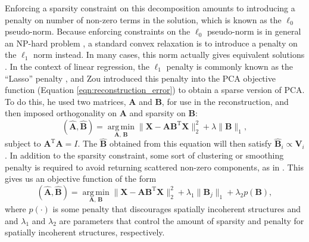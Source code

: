 \documentclass[11pt]{nih}
\begin{document}
Enforcing a sparsity constraint on this decomposition amounts to introducing a penalty on number of non-zero terms in the solution, which is known as the  $\ell_0$ pseudo-norm.  Because enforcing constraints on the $\ell_0$ pseudo-norm is in general an NP-hard problem \cite{natarajan_sparse_1995}, a standard convex relaxation is to introduce a penalty on the $\ell_1$ norm instead.  In many cases, this norm actually gives equivalent solutions \cite{donoho_for_2006}.   In the context of linear regression, the $\ell_1$ penalty is commonly known as the ``Lasso'' penalty \cite{tibshirani_regression_1996}, and Zou \cite{zou_sparse_2006} introduced this penalty into the PCA objective function (Equation \ref{eqn:reconstruction_error}) to obtain a sparse version of PCA. To do this, he used two matrices, $\mathbf{A}$ and $\mathbf{B}$, for use in the reconstruction, and then imposed orthogonality on $\mathbf{A}$ and sparsity on $\mathbf{B}$: 
\begin{equation}
(\hat{\mathbf{A}},\hat{\mathbf{B}}) = \underset{\mathbf{A},\, \mathbf{B}} {\operatorname{arg\,min}}  \| \mathbf{X} - \mathbf{A} \mathbf{B}^{\mathrm{T}} \mathbf{X}\|_2^2 + \lambda \| \mathbf{B}\|_1,
\end{equation}
subject to $\mathbf{A}^{\mathrm{T}} \mathbf{A} = I$.  The $\hat{\mathbf{B}}$ obtained from this equation will then satisfy $\hat{\mathbf{B}}_i \propto  \mathbf{V}_i$.  In addition to the sparsity constraint, some sort of clustering or smoothing penalty is required to avoid returning scattered non-zero components, as in \cite{batmanghelich_general_2009}.  This gives us an objective function of the form 
\begin{equation}
(\hat{\mathbf{A}},\hat{\mathbf{B}}) = \underset{\mathbf{A},\, \mathbf{B}} {\operatorname{arg\,min}}  \| \mathbf{X} - \mathbf{A} \mathbf{B}^{\mathrm{T}} \mathbf{X}\|_2^2 + \lambda_1 \| \mathbf{B}_j\|_1 + \lambda_2 p(\mathbf{B}),
\label{eqn:spca}
\end{equation}
where $p(\cdot)$ is some penalty that discourages spatially incoherent structures and and $\lambda_1$ and $\lambda_2$ are parameters that control the amount of sparsity and penalty for spatially incoherent structures, respectively.  
\end{document}

